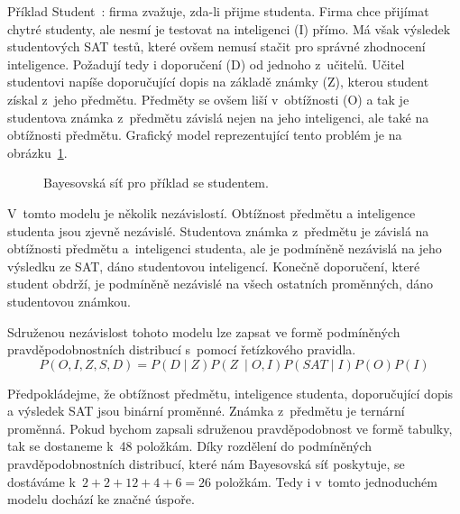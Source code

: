 Příklad Student~\cite{koller2009probabilistic}: firma zvažuje, zda-li přijme studenta.
Firma chce přijímat chytré studenty, ale nesmí je testovat na inteligenci (I) přímo.
Má však výsledek studentových SAT testů, které ovšem nemusí stačit pro správné zhodnocení inteligence.
Požadují tedy i doporučení (D) od jednoho z~učitelů.
Učitel studentovi napíše doporučující dopis na základě známky (Z), kterou student získal z~jeho předmětu.
Předměty se ovšem liší v~obtížnosti (O) a tak je studentova známka z~předmětu závislá nejen na jeho inteligenci, ale také na obtížnosti předmětu.
Grafický model reprezentující tento problém je na obrázku~\ref{fig:student}.
\begin{figure}
\begin{center}
\end{center}
\label{fig:student}
\caption{Bayesovská síť pro příklad se studentem.}
\end{figure}

V~tomto modelu je několik nezávislostí. Obtížnost předmětu a inteligence studenta jsou zjevně nezávislé.
Studentova známka z~předmětu je závislá na obtížnosti předmětu a~inteligenci studenta, ale je podmíněně nezávislá na jeho výsledku ze SAT, dáno studentovou inteligencí.
Konečně doporučení, které student obdrží, je podmíněně nezávislé na všech ostatních proměnných, dáno studentovou známkou.

Sdruženou nezávislost tohoto modelu lze zapsat ve formě podmíněných pravděpodobnostních distribucí s~pomocí řetízkového pravidla.
\begin{equation}
P(O, I, Z, S, D) = P(D \mid Z) P(Z~\mid O, I) P(SAT \mid I) P(O) P(I)
\end{equation}

Předpokládejme, že obtížnost předmětu, inteligence studenta, doporučující dopis a výsledek SAT jsou binární proměnné.
Známka z~předmětu je ternární proměnná.
Pokud bychom zapsali sdruženou pravděpodobnost ve formě tabulky, tak se dostaneme k~48 položkám.
Díky rozdělení do podmíněných pravděpodobnostních distribucí, které nám Bayesovská síť poskytuje, se dostáváme k~$2 + 2 + 12 + 4 + 6 = 26$ položkám.
Tedy i v~tomto jednoduchém modelu dochází ke značné úspoře.

